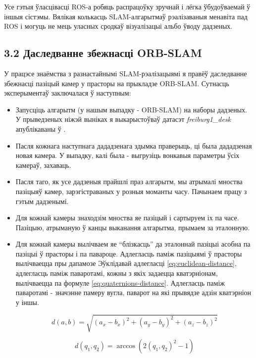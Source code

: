 Усе гэтыя ўласцівасці ROS-а робяць распрацоўку зручнай і лёгка ўбудоўваемай ў іншыя сістэмы.
Вялікая колькасць SLAM-алгарытмаў рэалізаваныя менавіта пад ROS і могуць не мець
уласных сродкаў візуалізацыі альбо ўводу дадзеных.

\subsection*{3.2 Даследванне збежнасці ORB-SLAM}

У працэсе знаёмства з разнастайнымі SLAM-рэалізацыямі я правёў даследванне збежнасці
пазіцый камер у прасторы на прыкладзе ORB-SLAM. Сутнасць эксперыментаў заключалася ў наступным:
\begin{itemize}
  \item Запусціць алгарытм (у нашым выпадку - ORB-SLAM) на наборы дадзеных. У прыведзеных ніжэй выніках
  я выкарыстоўваў датасэт \textit{freiburg1\_desk} апублікаваны ў \cite{sturm12iros}.
  \item Пасля кожнага наступнага дададзенага здымка праверыць, ці была дададзеная новая камера.
  У выпадку, калі была - выгрузіць вонкавыя параметры ўсіх камераў, захаваць.
  \item Пасля таго, як усе дадзеныя прайшлі праз алгарытм, мы атрымалі мноства
  пазіцыяў камер, зарэгістраваных у розныя моманты часу. Пачынаем працу з гэтым дадзенымі.
  \item Для кожнай камеры знаходзім мноства яе пазіцый і сартыруем іх па часе. Пазіцыю, атрыманую
  ў канцы выканання алгарытма, прымаем за эталонную.
  \item Для кожнай камеры вылічваем яе ``блізкасць'' да эталоннай пазіцыі асобна па пазіцыі
  ў прасторы і па павароце. Адлегласць паміж пазіцыямі ў прасторы вылічваецца пры дапамозе
  Эўклідавай адлегласці \eqref{eq:euclidean-distance}, адлегласць паміж паваротамі, кожны з якіх
  задаецца кватэрніонам, вылічваецца па формуле \eqref{eq:quaternions-distance}. Адлегласць паміж
  паваротамі - значэнне памеру вугла, паварот на які прывядзе адзін кватэрніон у іншы.

  \begin{equation} \label{eq:euclidean-distance}
    d(a,b) = \sqrt{(a_x-b_x)^2 + (a_y-b_y)^2 + (a_z-b_z)^2}
  \end{equation}

  \begin{equation} \label{eq:quaternions-distance}
    d(q_1,q_2) = \arccos(2(q_1,q_2)^2-1)
  \end{equation}


\end{itemize}
